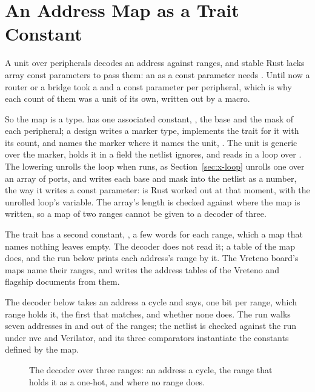 \section{An Address Map as a Trait Constant}
\label{sec:x-map}

A unit over  peripherals decodes an address against 
ranges, and stable Rust lacks array const parameters to pass them:
an \code{[usize; N]} as a const parameter needs
. Until now a router or a bridge took a
 and a  const parameter per peripheral, which is
why each count of them was a unit of its own, written out by a macro.

So the map is a type.  has one
associated constant, , the base
and the mask of each peripheral; a design writes a marker type,
implements the trait for it with its count, and names the marker
where it names the unit, . The unit is generic
over the marker, holds it in a  field the netlist
ignores, and reads  in a loop over .
The lowering unrolls the loop when  runs, as
Section~\ref{sec:x-loop} unrolls one over an array of ports, and
writes each base and mask into the netlist as a number, the way it
writes a const parameter:  is Rust worked out
at that moment, with  the unrolled loop's variable. The
array's length is checked against  where the map is written,
so a map of two ranges cannot be given to a decoder of three.

The trait has a second constant, , a few words for each
range, which a map that names nothing leaves empty. The decoder does
not read it; a table of the map does, and the run below prints each
address's range by it. The Vreteno board's maps name their ranges,
and  writes the address tables of the Vreteno and
flagship documents from them.

The decoder below takes an address a cycle and says, one bit per
range, which range holds it, the first that matches, and whether
none does. The run walks seven addresses in and out of the ranges;
the netlist is checked against the run under nvc and Verilator, and
its three comparators instantiate the constants defined by the map.

\begin{figure}[htbp]
\centering

\caption{The decoder over three ranges: an address a cycle, the
range that holds it as a one-hot, and  where no range
does.}
\label{fig:x-map}
\end{figure}





